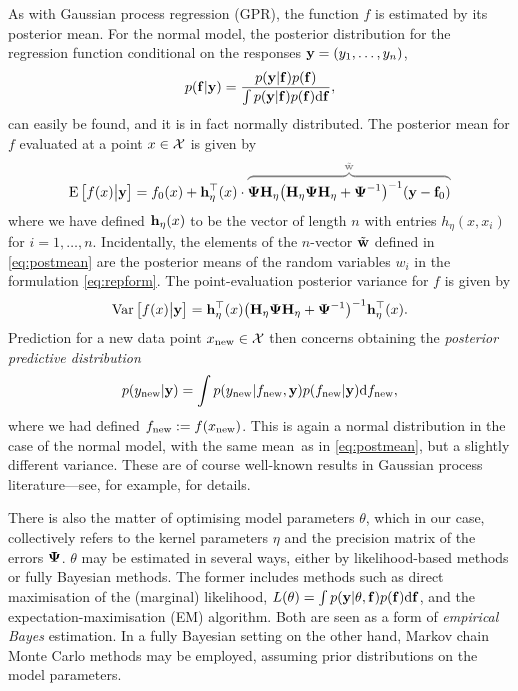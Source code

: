 \documentclass[a4paper,showframe,11pt]{report}
\begin{document}
As with Gaussian process regression (GPR), the function $f$ is estimated by its posterior mean.
For the normal model, the posterior distribution for the regression function conditional on the responses ${\mathbf y} = (y_1,\dots,y_n)$,
%
\begin{align}
  p({\mathbf f}|{\mathbf y}) = \frac{p({\mathbf y}|{\mathbf f})p({\mathbf f})}{\int p({\mathbf y}|{\mathbf f})p({\mathbf f}) \text{d} {\mathbf f}},
\end{align}
%
can easily be found, and it is in fact normally distributed.
The posterior mean for $f$ evaluated at a point $x \in {\mathcal X}$ is given by
%
\begin{align}\label{eq:postmean}
  \E\big[f(x)\big|\by\big] = f_0(x) + \bh_\eta^\top(x) \cdot
  {\color{gray}
  \overbrace{\color{black} \bPsi\bH_\eta \big(\bH_\eta\bPsi\bH_\eta + \bPsi^{-1}\big)^{-1} (\by -\bff_0 )}^{\tilde \bw}
  }
\end{align}
%
where we have defined ${\mathbf h}_\eta(x)$ to be the vector of length $n$ with entries $h_\eta(x,x_i)$ for $i=1,\dots,n$.
Incidentally, the elements of the $n$-vector $\tilde {{\mathbf w}}$ defined in \cref{eq:postmean} are the posterior means of the random variables $w_i$ in the formulation \cref{eq:repform}.
The point-evaluation posterior variance for $f$ is given by
%
\begin{align}\label{eq:postvar}
  \operatorname{Var}\big[f(x)\big|{\mathbf y}\big] = {\mathbf h}_\eta^\top(x)\big( {\mathbf H}_\eta{\bm\Psi}{\mathbf H}_\eta + {\bm\Psi}^{-1} \big)^{-1} {\mathbf h}_\eta^\top(x).
\end{align}
%
Prediction for a new data point $x_{\text{new}} \in {\mathcal X}$ then concerns obtaining the \emph{posterior predictive distribution}
%
\[
  p(y_{\text{new}}|{\mathbf y}) = \int p(y_{\text{new}}|f_{\text{new}},{\mathbf y})p(f_{\text{new}}|{\mathbf y}) \text{d} f_{\text{new}},
\]
%
where we had defined $f_{\text{new}} := f(x_{\text{new}})$.
This is again a normal distribution in the case of the normal model, with the same mean\footnotemark~as in \cref{eq:postmean}, but a slightly different variance.
These are of course well-known results in Gaussian process literature---see, for example, \citet{rasmussen2006gaussian} for details.


There is also the matter of optimising model parameters $\theta$, which in our case, collectively refers to the kernel parameters $\eta$ and the precision matrix of the errors ${\bm\Psi}$.
$\theta$ may be estimated in several ways, either by likelihood-based methods or fully Bayesian methods.
The former includes methods such as direct maximisation of the (marginal) likelihood, $L(\theta) = \int p({\mathbf y}|\theta,{\mathbf f})p({\mathbf f})\text{d}{\mathbf f}$, and the expectation-maximisation (EM) algorithm.
Both are seen as a form of \emph{empirical Bayes} estimation.
In a fully Bayesian setting on the other hand, Markov chain Monte Carlo methods may be employed, assuming prior distributions on the model parameters.
\end{document}
